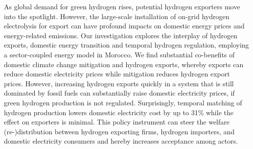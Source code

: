 




As global demand for green hydrogen rises, potential hydrogen exporters move into the spotlight.
However, the large-scale installation of on-grid hydrogen electrolysis for export can have profound impacts on domestic energy prices and energy-related emissions.
Our investigation explores the interplay of hydrogen exports, domestic energy transition and temporal hydrogen regulation, employing a sector-coupled energy model in Morocco. 
We find substantial co-benefits of domestic climate change mitigation and hydrogen exports, whereby exports can reduce domestic electricity prices while mitigation reduces hydrogen export prices.
However, increasing hydrogen exports quickly in a system that is still dominated by fossil fuels can substantially raise domestic electricity prices, if green hydrogen production is not regulated.
Surprisingly, temporal matching of hydrogen production lowers domestic electricity cost by up to 31\% while the effect on exporters is minimal. 
This policy instrument can steer the welfare (re-)distribution between hydrogen exporting firms, hydrogen importers, and domestic electricity consumers and hereby increases acceptance among actors.

